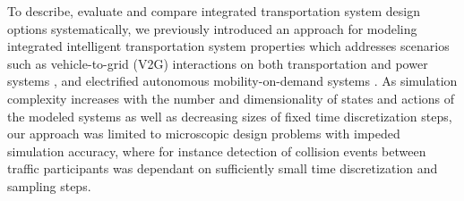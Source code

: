 \documentclass[graybox]{svmult}
\begin{document}

To describe, evaluate and compare integrated transportation system design options systematically, we previously introduced an approach for modeling integrated intelligent transportation system properties which addresses scenarios such as vehicle-to-grid (V2G) interactions on both transportation and power systems \cite{Ascher2015}, \cite{Ascher2016} and electrified autonomous mobility-on-demand systems \cite{Ascher2017}. As simulation complexity increases with the number and dimensionality of states and actions of the modeled systems as well as decreasing sizes of fixed time discretization steps, our approach was limited to microscopic design problems with impeded simulation accuracy, where for instance detection of collision events between traffic participants was dependant on sufficiently small time discretization and sampling steps.
\end{document}
